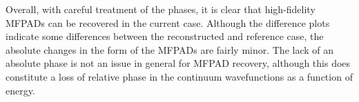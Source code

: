 Overall, with careful treatment of the phases, it is clear that high-fidelity MFPADs can be recovered in the current case. Although the difference plots indicate some differences between the reconstructed and reference case, the absolute changes in the form of the MFPADs are fairly minor. The lack of an absolute phase is not an issue in general for MFPAD recovery, although this does constitute a loss of relative phase in the continuum wavefunctions as a function of energy. %


